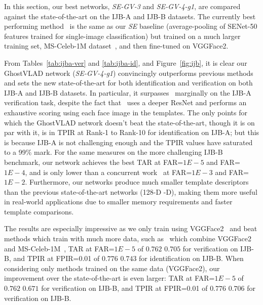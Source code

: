 \documentclass[runningheads]{llncs}
\begin{document}
\begin{table*}[t]
\begin{center}
{{\begin{tabular}{c|c|c|c|c|c|c|c}
\hline
\end{tabular}}}
\end{center}
\vspace{-1.5mm}
\caption{\textbf{Comparison with state-of-the-art for
{\em identification} on the IJB-A and IJB-B datasets.}
A higher value of TPIR is better. 
See caption of Tab.~\ref{tab:ijba-ver} for explanations of abbreviations.
Our best network, SE-GV-4-g1, sets the state-of-the-art by a significant
margin on both datasets.
}
\label{tab:ijba-id}
\vspace{-4mm}
\end{table*}



 

In this section, our best networks,
\emph{SE-GV-3} and \emph{SE-GV-4-g1},
are compared against the state-of-the-art
on the IJB-A and IJB-B datasets.
The currently best performing method~\cite{Cao18}
is the same as our \emph{SE} baseline
(\ie average-pooling of SENet-50 features
trained for single-image classification)
but trained on a much larger training set,
MS-Celeb-1M dataset~\cite{Guo16},
and then fine-tuned on VGGFace2.

From Tables~\ref{tab:ijba-ver} and \ref{tab:ijba-id},
and Figure~\ref{fig:ijb},
it is clear our GhostVLAD network (\emph{SE-GV-4-g1})
convincingly outperforms previous methods and sets
the new state-of-the-art for both identification and
verification on both IJB-A and IJB-B datasets.
In particular, it surpasses~\cite{Zheng18} marginally
on the IJB-A verification task,  
despite the fact that~\cite{Zheng18}
uses a deeper ResNet and performs an exhaustive
scoring using each face image in the templates.
The only points for which the GhostVLAD network 
doesn't beat the state-of-the-art, 
though it is on par with it, 
is in TPIR at Rank-1 to Rank-10
for identification on IJB-A;  but this is because
IJB-A is not challenging enough and the TPIR values have
saturated to a 99\% mark.
For the same measures on the more challenging IJB-B benchmark, 
our network achieves the best TAR at FAR=$1E-5$ and FAR=$1E-4$,
and is only lower than a concurrent work~\cite{Xie18a} at FAR=$1E-3$ and FAR=$1E-2$.
Furthermore, our networks produce much 
smaller template descriptors than the previous state-of-the-art 
networks (128-D -D),
making them more useful 
in real-world applications due to smaller memory requirements
and faster template comparisons.


The results are especially impressive as we only train
using VGGFace2~\cite{Cao18} and beat methods which train with much more
data, such as~\cite{Cao18}
which combine VGGFace2 and MS-Celeb-1M~\cite{Guo16},
\eg TAR at FAR=$1E-5$ of $0.762$ \vs $0.705$ for verification on IJB-B,
and TPIR at FPIR=0.01 of $0.776$ \vs $0.743$ for identification on IJB-B.
When considering only methods trained on the same data (VGGFace2),
our improvement over the state-of-the-art is even larger:
TAR at FAR=$1E-5$ of $0.762$ \vs $0.671$ for verification on IJB-B,
and TPIR at FPIR=0.01 of $0.776$ \vs $0.706$ for verification on IJB-B.
\end{document}
